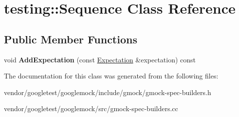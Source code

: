\hypertarget{classtesting_1_1_sequence}{}\section{testing\+:\+:Sequence Class Reference}
\label{classtesting_1_1_sequence}
\subsection*{Public Member Functions}
\begin{DoxyCompactItemize}
\item 
\mbox{\label{classtesting_1_1_sequence_ac5b77b3b5b2e229ccbc13be1f3d17a9c}} 
void {\bfseries Add\+Expectation} (const \mbox{\hyperlink{classtesting_1_1_expectation}{Expectation}} \&expectation) const
\end{DoxyCompactItemize}


The documentation for this class was generated from the following files\+:\begin{DoxyCompactItemize}
\item 
vendor/googletest/googlemock/include/gmock/gmock-\/spec-\/builders.\+h\item 
vendor/googletest/googlemock/src/gmock-\/spec-\/builders.\+cc\end{DoxyCompactItemize}
